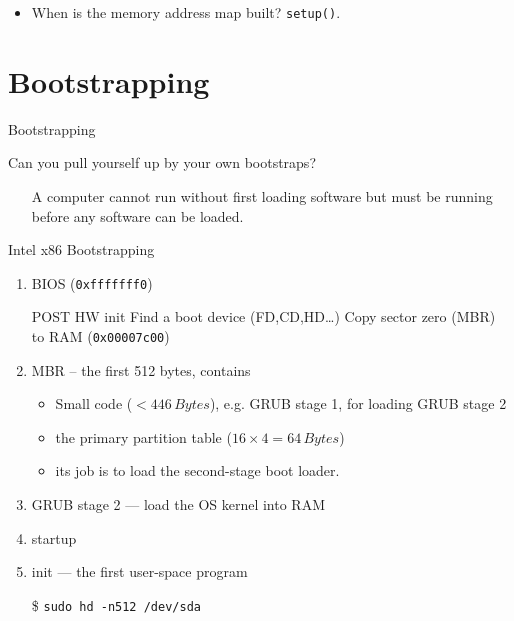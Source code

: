 \begin{itemize}
\item When is the memory address map built? \texttt{setup()}.
\end{itemize}

\section{Bootstrapping}
\label{sec:bootstrapping}

\begin{frame}{Bootstrapping}
  \begin{block}{Can you pull yourself up by your own bootstraps?}
    \begin{itemize}
    \item[] A computer cannot run without first loading software but must be running
      before any software can be loaded.
    \end{itemize}
  \end{block}
  \begin{center}
  \end{center}
\end{frame}

\begin{frame}{Intel x86 Bootstrapping}
  \begin{enumerate}
  \item BIOS (\texttt{0xfffffff0})\\
    \begin{small}
      {} POST\quad
      {} HW init\quad
      {} Find a boot device (FD,CD,HD\ldots{})\quad
      {} Copy \alert{sector zero (MBR)} to RAM (\texttt{0x00007c00})
    \end{small}
  \item MBR -- the first 512 bytes, contains
    \begin{itemize}
    \item Small code ($< 446\,Bytes$), e.g. GRUB stage 1, for loading GRUB stage 2
    \item the primary partition table ($16\times{}4=64\,Bytes$)
    \item its job is to load the second-stage boot loader.
    \end{itemize}
  \item GRUB stage 2 --- load the OS kernel into RAM
  \item {\linux} startup
  \item init --- the first user-space program
  \end{enumerate}
  \begin{center}
  \end{center}
  \begin{itemize}
  \item[\$] \texttt{sudo hd -n512 /dev/sda}
  \end{itemize}
\end{frame}

